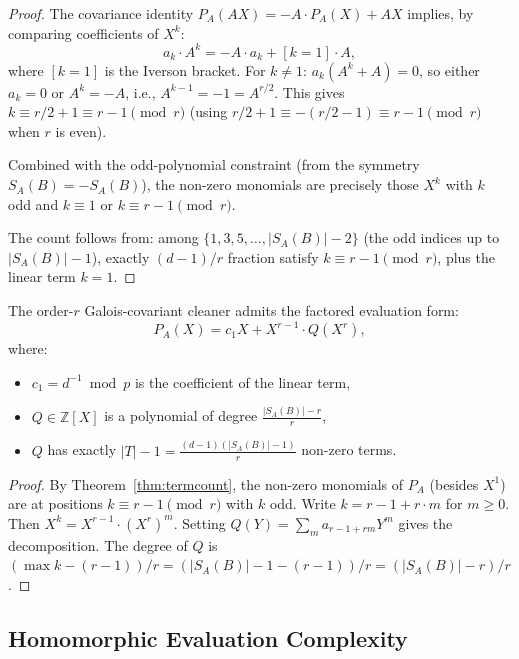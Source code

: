 \begin{proof}
The covariance identity $P_A(AX) = -A \cdot P_A(X) + AX$ implies, by comparing coefficients of $X^k$:
\[
a_k \cdot A^k = -A \cdot a_k + [k=1] \cdot A,
\]
where $[k=1]$ is the Iverson bracket.
For $k \neq 1$: $a_k(A^k + A) = 0$, so either $a_k = 0$ or $A^k = -A$, i.e., $A^{k-1} = -1 = A^{r/2}$.
This gives $k \equiv r/2 + 1 \equiv r-1 \pmod{r}$ (using $r/2 + 1 \equiv -(r/2 - 1) \equiv r-1 \pmod{r}$ when $r$ is even).

Combined with the odd-polynomial constraint (from the symmetry $S_A(B) = -S_A(B)$), the non-zero monomials are precisely those $X^k$ with $k$ odd and $k \equiv 1$ or $k \equiv r-1 \pmod{r}$.

The count follows from: among $\{1, 3, 5, \ldots, |S_A(B)|-2\}$ (the odd indices up to $|S_A(B)|-1$), exactly $(d-1)/r$ fraction satisfy $k \equiv r-1 \pmod{r}$, plus the linear term $k=1$.
\end{proof}

\begin{theorem}\label{thm:decomposition}
The order-$r$ Galois-covariant cleaner admits the factored evaluation form:
\[
P_A(X) = c_1 X + X^{r-1} \cdot Q(X^r),
\]
where:
\begin{itemize}
\item $c_1 = d^{-1} \bmod p$ is the coefficient of the linear term,
\item $Q \in \mathbb{Z}[X]$ is a polynomial of degree $\displaystyle\frac{|S_A(B)| - r}{r}$,
\item $Q$ has exactly $|T| - 1 = \frac{(d-1)(|S_A(B)|-1)}{r}$ non-zero terms.
\end{itemize}
\end{theorem}

\begin{proof}
By Theorem~\ref{thm:termcount}, the non-zero monomials of $P_A$ (besides $X^1$) are at positions $k \equiv r-1 \pmod{r}$ with $k$ odd.
Write $k = r-1 + r \cdot m$ for $m \geq 0$. Then $X^k = X^{r-1} \cdot (X^r)^m$.
Setting $Q(Y) = \sum_m a_{r-1+rm} Y^m$ gives the decomposition.
The degree of $Q$ is $(\max k - (r-1))/r = (|S_A(B)| - 1 - (r-1))/r = (|S_A(B)| - r)/r$.
\end{proof}

\subsection{Homomorphic Evaluation Complexity}

